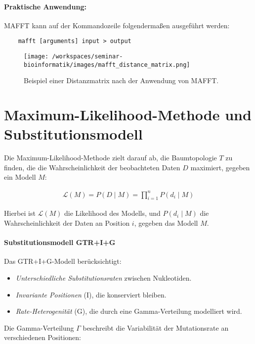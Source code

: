 \paragraph{Praktische Anwendung:}
MAFFT kann auf der Kommandozeile folgendermaßen ausgeführt werden:
\begin{verbatim}
    mafft [arguments] input > output
\end{verbatim}

\begin{figure}[H]
    \centering
    \texttt{[image: /workspaces/seminar-bioinformatik/images/mafft\_distance\_matrix.png]}
    \caption{Beispiel einer Distanzmatrix nach der Anwendung von MAFFT. \autocite{peesThreeGeneticallyDistinct2019}}
    \label{fig:mafft-distance-matrix}
\end{figure}

\section{Maximum-Likelihood-Methode und Substitutionsmodell} \label{sec:maxlikelihood}

Die Maximum-Likelihood-Methode zielt darauf ab, die Baumtopologie $T$ zu finden, die die Wahrscheinlichkeit der beobachteten Daten $D$ maximiert, gegeben ein Modell $M$:

\begin{align}
    \mathcal{L}(M) = P(D \mid M) = \prod_{i=1}^{n} P(d_i \mid M)
\end{align}

Hierbei ist $\mathcal{L}(M)$ die Likelihood des Modells, und $P(d_i \mid M)$ die Wahrscheinlichkeit der Daten an Position $i$, gegeben das Modell $M$.

\paragraph{Substitutionsmodell GTR+I+G}
Das GTR+I+G-Modell berücksichtigt:
\begin{itemize}
    \item \textit{Unterschiedliche Substitutionsraten} zwischen Nukleotiden.
    \item \textit{Invariante Positionen} (I), die konserviert bleiben.
    \item \textit{Rate-Heterogenität} (G), die durch eine Gamma-Verteilung modelliert wird.
\end{itemize}

Die Gamma-Verteilung $\Gamma$ beschreibt die Variabilität der Mutationsrate an verschiedenen Positionen:

